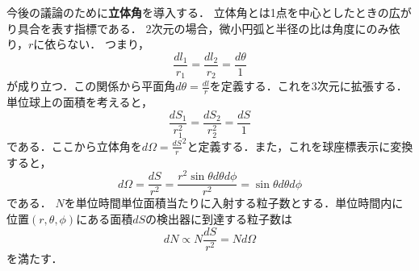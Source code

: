 \documentclass{report}
\begin{document}
  今後の議論のために\textbf{立体角}を導入する．
  立体角とは1点を中心としたときの広がり具合を表す指標である．
  2次元の場合，微小円弧と半径の比は角度にのみ依り，$r$に依らない．
  つまり，
  \begin{equation}
    \frac{dl_1}{r_1}=\frac{dl_2}{r_2}=\frac{d\theta}{1}
  \end{equation}
  が成り立つ．この関係から平面角$d\theta=\frac{dl}{r}$を定義する．これを3次元に拡張する．単位球上の面積を考えると，
  \begin{equation}
    \frac{dS_1}{r_1^2}=\frac{dS_2}{r_2^2}=\frac{dS}{1}
  \end{equation}
  である．ここから立体角を$d\Omega=\frac{dS}r^2$と定義する．また，これを球座標表示に変換すると，
  \begin{equation}
    d\Omega = \frac{dS}{r^2} = \frac{r^2\sin\theta d\theta d\phi}{r^2} = \sin \theta d\theta d\phi
  \end{equation}
  である．
  $N$を単位時間単位面積当たりに入射する粒子数とする．単位時間内に位置$(r,\theta,\phi)$にある面積$dS$の検出器に到達する粒子数は
  \begin{equation}
    dN\propto N \frac{dS}{r^2} = N d\Omega
  \end{equation}
  を満たす．
\end{document}
